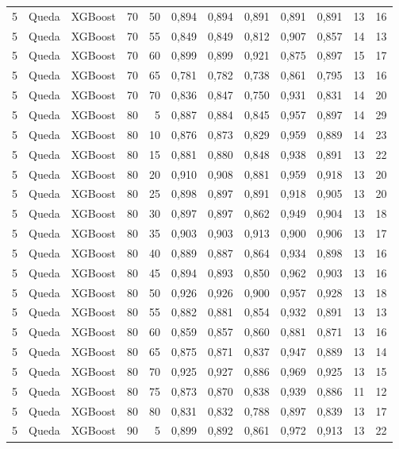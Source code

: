 \begin{longtable}{@{}rllrrrrrrrrr@{}}
5 & Queda & XGBoost & 70 & 50 & 0,894 & 0,894 & 0,891 & 0,891 & 0,891 & 13 & 16 \\
5 & Queda & XGBoost & 70 & 55 & 0,849 & 0,849 & 0,812 & 0,907 & 0,857 & 14 & 13 \\
5 & Queda & XGBoost & 70 & 60 & 0,899 & 0,899 & 0,921 & 0,875 & 0,897 & 15 & 17 \\
5 & Queda & XGBoost & 70 & 65 & 0,781 & 0,782 & 0,738 & 0,861 & 0,795 & 13 & 16 \\
5 & Queda & XGBoost & 70 & 70 & 0,836 & 0,847 & 0,750 & 0,931 & 0,831 & 14 & 20 \\
5 & Queda & XGBoost & 80 & 5 & 0,887 & 0,884 & 0,845 & 0,957 & 0,897 & 14 & 29 \\
5 & Queda & XGBoost & 80 & 10 & 0,876 & 0,873 & 0,829 & 0,959 & 0,889 & 14 & 23 \\
5 & Queda & XGBoost & 80 & 15 & 0,881 & 0,880 & 0,848 & 0,938 & 0,891 & 13 & 22 \\
5 & Queda & XGBoost & 80 & 20 & 0,910 & 0,908 & 0,881 & 0,959 & 0,918 & 13 & 20 \\
5 & Queda & XGBoost & 80 & 25 & 0,898 & 0,897 & 0,891 & 0,918 & 0,905 & 13 & 20 \\
5 & Queda & XGBoost & 80 & 30 & 0,897 & 0,897 & 0,862 & 0,949 & 0,904 & 13 & 18 \\
5 & Queda & XGBoost & 80 & 35 & 0,903 & 0,903 & 0,913 & 0,900 & 0,906 & 13 & 17 \\
5 & Queda & XGBoost & 80 & 40 & 0,889 & 0,887 & 0,864 & 0,934 & 0,898 & 13 & 16 \\
5 & Queda & XGBoost & 80 & 45 & 0,894 & 0,893 & 0,850 & 0,962 & 0,903 & 13 & 16 \\
5 & Queda & XGBoost & 80 & 50 & 0,926 & 0,926 & 0,900 & 0,957 & 0,928 & 13 & 18 \\
5 & Queda & XGBoost & 80 & 55 & 0,882 & 0,881 & 0,854 & 0,932 & 0,891 & 13 & 13 \\
5 & Queda & XGBoost & 80 & 60 & 0,859 & 0,857 & 0,860 & 0,881 & 0,871 & 13 & 16 \\
5 & Queda & XGBoost & 80 & 65 & 0,875 & 0,871 & 0,837 & 0,947 & 0,889 & 13 & 14 \\
5 & Queda & XGBoost & 80 & 70 & 0,925 & 0,927 & 0,886 & 0,969 & 0,925 & 13 & 15 \\
5 & Queda & XGBoost & 80 & 75 & 0,873 & 0,870 & 0,838 & 0,939 & 0,886 & 11 & 12 \\
5 & Queda & XGBoost & 80 & 80 & 0,831 & 0,832 & 0,788 & 0,897 & 0,839 & 13 & 17 \\
5 & Queda & XGBoost & 90 & 5 & 0,899 & 0,892 & 0,861 & 0,972 & 0,913 & 13 & 22 \\

\end{longtable}
